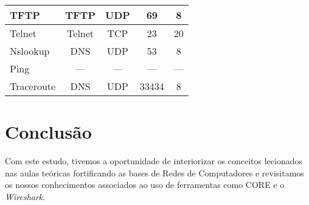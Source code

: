 \documentclass[runningheads]{llncs}
\begin{document}
\begin{center}
\begin{table}[]
{\begin{tabular}{|l|c|c|c|c|}
    TFTP                                              & TFTP                                                                                & UDP                                                                                 & 69                                                                               & 8                                                                                            \\ \hline
    Telnet                                            & Telnet                                                                              & TCP                                                                                 & 23                                                                               & 20                                                                                           \\ \hline
    Nslookup                                          & DNS                                                                                 & UDP                                                                                 & 53                                                                               & 8                                                                                            \\ \hline
    Ping                                              & ---                                                                                 & ---                                                                                 & ---                                                                              & ---                                                                                          \\ \hline
    \multicolumn{1}{|c|}{Traceroute}                  & DNS                                                                                 & UDP                                                                                 & 33434                                                                            & 8                                                                                            \\ \hline
    \end{tabular}%
    }
    \end{table}
    \end{center}
    
    \bigskip
    \pagebreak
    
\section{Conclusão}
    Com este estudo, tivemos a oportunidade de interiorizar os conceitos lecionados nas aulas teóricas fortificando as bases de Redes de Computadores e revisitamos os nossos conhecimentos associados ao uso de ferramentas como CORE e o \textit{Wireshark}.
    
\end{document}
